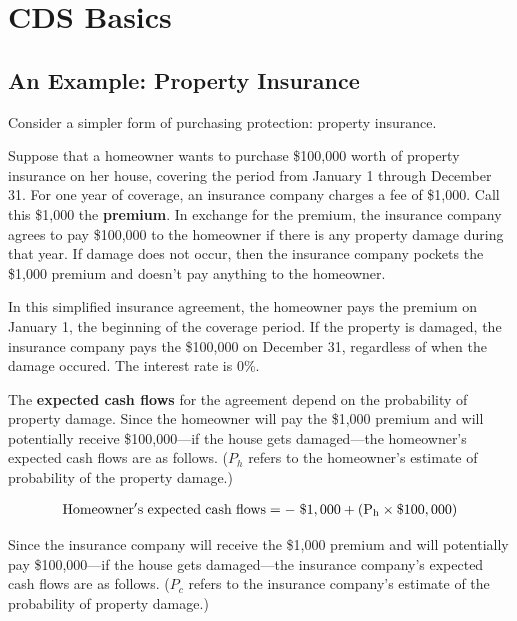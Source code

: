 \documentclass{jss}
\begin{document}
\section{CDS Basics}

\subsection{An Example: Property Insurance}

Consider a simpler form of purchasing protection: property insurance. 

Suppose that a homeowner wants to purchase \$100,000 worth of property insurance on her house, covering the period from January 1 through December 31. For one year of coverage, an insurance company charges a fee of \$1,000. Call this \$1,000 the \textbf{premium}. In exchange for the premium, the insurance company agrees to pay \$100,000 to the homeowner if there is any property damage during that year. If damage does not occur, then the insurance company pockets the \$1,000 premium and doesn't pay anything to the homeowner. 

In this simplified insurance agreement, the homeowner pays the premium on January 1, the beginning of the coverage period. If the property is damaged, the insurance company pays the \$100,000 on December 31, regardless of when the damage occured. The interest rate is 0\%.

The \textbf{expected cash flows} for the agreement depend on the probability of property damage. Since the homeowner will pay the \$1,000 premium and will potentially receive \$100,000---if the house gets damaged---the homeowner's expected cash flows are as follows. ($P_h$ refers to the homeowner's estimate of probability of the property damage.)

\begin{equation}
 \begin{aligned}
   {\rm Homeowner's\hspace{3pt}expected\hspace{3pt}cash\hspace{3pt}flows = -\hspace{3pt}\$1,000 + (P_h \times {\$100,000})}
    \end{aligned}
    \label{eqn:homeownerECF}
\end{equation}

Since the insurance company will receive the \$1,000 premium and will potentially pay \$100,000---if the house gets damaged---the insurance company's expected cash flows are as follows. ($P_c$ refers to the insurance company's estimate of the probability of property damage.)
\end{document}
